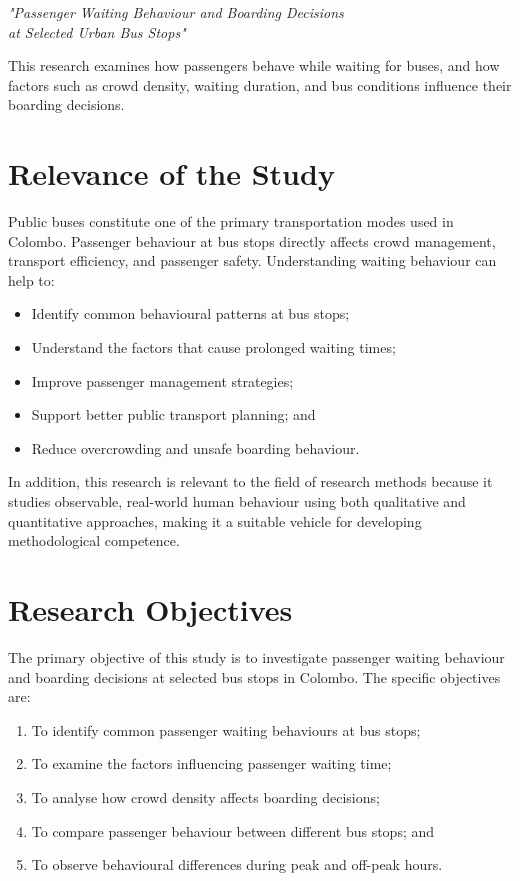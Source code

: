 \documentclass[12pt, a4paper]{report}
\begin{document}
\begin{center}
    \textit{"Passenger Waiting Behaviour and Boarding Decisions\\
    at Selected Urban Bus Stops"}
\end{center}

This research examines how passengers behave while waiting for buses, and how factors
such as crowd density, waiting duration, and bus conditions influence their boarding
decisions.

\section{Relevance of the Study}

Public buses constitute one of the primary transportation modes used in Colombo. Passenger
behaviour at bus stops directly affects crowd management, transport efficiency, and passenger
safety. Understanding waiting behaviour can help to:

\begin{itemize}[noitemsep]
    \item Identify common behavioural patterns at bus stops;
    \item Understand the factors that cause prolonged waiting times;
    \item Improve passenger management strategies;
    \item Support better public transport planning; and
    \item Reduce overcrowding and unsafe boarding behaviour.
\end{itemize}

In addition, this research is relevant to the field of research methods because it studies
observable, real-world human behaviour using both qualitative and quantitative approaches,
making it a suitable vehicle for developing methodological competence.

\section{Research Objectives}

The primary objective of this study is to investigate passenger waiting behaviour and boarding
decisions at selected bus stops in Colombo. The specific objectives are:

\begin{enumerate}[noitemsep]
    \item To identify common passenger waiting behaviours at bus stops;
    \item To examine the factors influencing passenger waiting time;
    \item To analyse how crowd density affects boarding decisions;
    \item To compare passenger behaviour between different bus stops; and
    \item To observe behavioural differences during peak and off-peak hours.
\end{enumerate}
\end{document}
